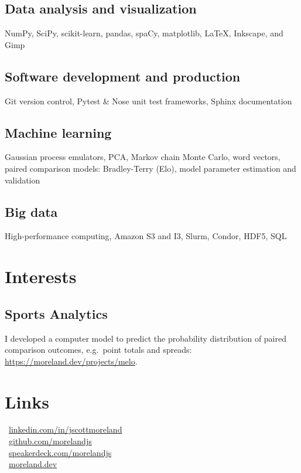 \documentclass[letterpaper,10pt]{article}
\begin{document}
\begin{multicols}{2}
\subsection{Data analysis and visualization}
\smallskip

NumPy, SciPy, scikit-learn, pandas, spaCy, matplotlib, LaTeX, Inkscape, and Gimp

\subsection{Software development and production}
\smallskip

Git version control, Pytest \& Nose unit test frameworks, Sphinx documentation

\subsection{Machine learning}
\smallskip

Gaussian process emulators, PCA, Markov chain Monte Carlo, word vectors, paired comparison models: Bradley-Terry (Elo), model parameter estimation and validation

\subsection{Big data}
\smallskip

High-performance computing, Amazon S3 and I3, Slurm, Condor, HDF5, SQL

\section{Interests}

\subsection{Sports Analytics}
\smallskip

I developed a computer model to predict the probability distribution of paired comparison outcomes, e.g.\ point totals and spreads: \href{https://moreland.dev/projects/melo}{https://moreland.dev/projects/melo}.

\section{Links}

 \textbar\ \href{https://www.linkedin.com/in/jscottmoreland}{linkedin.com/in/jscottmoreland}\\[1ex]
 \textbar\ \href{https://github.com/morelandjs}{github.com/morelandjs}\\[1ex]
 \textbar\ \href{https://www.linkedin.com/in/jscottmoreland/}{speakerdeck.com/morelandjs}\\[1ex]
 \textbar\ \href{https://moreland.dev}{moreland.dev}\\

\end{multicols}
\end{document}
